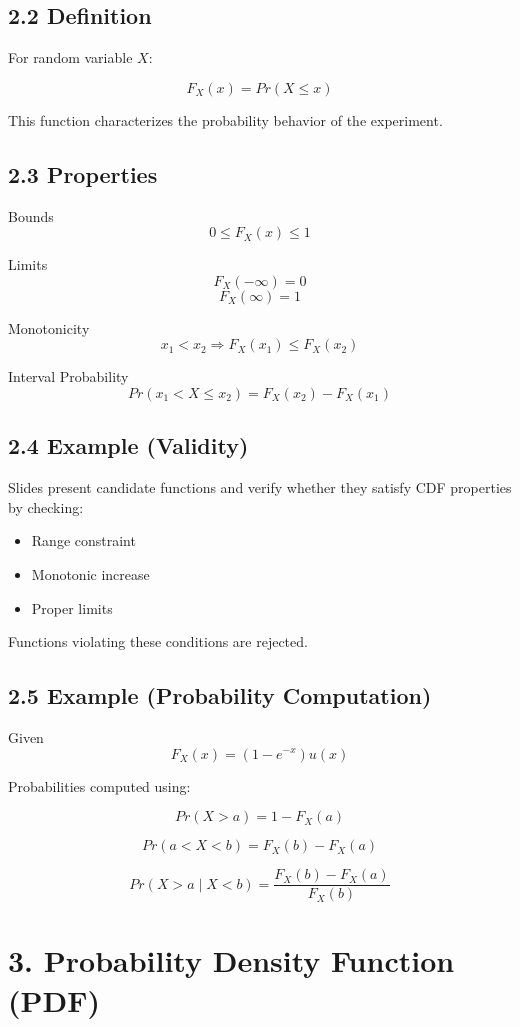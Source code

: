 \documentclass[11pt]{article}
\begin{document}
\subsection*{2.2 Definition}

For random variable $X$:

\[
F_X(x)=Pr(X \le x)
\]

This function characterizes the probability behavior of the experiment.

\subsection*{2.3 Properties}

Bounds
\[
0 \le F_X(x) \le 1
\]

Limits
\[
F_X(-\infty)=0
\]
\[
F_X(\infty)=1
\]

Monotonicity
\[
x_1 < x_2 \Rightarrow F_X(x_1)\le F_X(x_2)
\]

Interval Probability
\[
Pr(x_1<X\le x_2)=F_X(x_2)-F_X(x_1)
\]

\subsection*{2.4 Example (Validity)}

Slides present candidate functions and verify whether they satisfy CDF properties by checking:

\begin{itemize}
\item Range constraint
\item Monotonic increase
\item Proper limits
\end{itemize}

Functions violating these conditions are rejected.

\subsection*{2.5 Example (Probability Computation)}

Given
\[
F_X(x)=(1-e^{-x})u(x)
\]

Probabilities computed using:

\[
Pr(X>a)=1-F_X(a)
\]

\[
Pr(a<X<b)=F_X(b)-F_X(a)
\]

\[
Pr(X>a \mid X<b)=\frac{F_X(b)-F_X(a)}{F_X(b)}
\]

\section*{3. Probability Density Function (PDF)}
\end{document}
